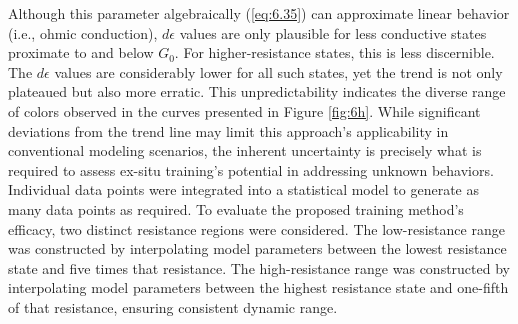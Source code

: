 \noindent Although this parameter algebraically (\ref{eq:6.35}) can approximate linear behavior (i.e., ohmic conduction), $d\epsilon$ values are only plausible for less conductive states proximate to and below $G_0$. For higher-resistance states, this is less discernible. The $d\epsilon$ values are considerably lower for all such states, yet the trend is not only plateaued but also more erratic. This unpredictability indicates the diverse range of colors observed in the curves presented in Figure \ref{fig:6h}. While significant deviations from the trend line may limit this approach's applicability in conventional modeling scenarios, the inherent uncertainty is precisely what is required to assess ex-situ training's potential in addressing unknown behaviors.\\


\noindent Individual data points were integrated into a statistical model to generate as many data points as required. To evaluate the proposed training method's efficacy, two distinct resistance regions were considered. The low-resistance range was constructed by interpolating model parameters between the lowest resistance state and five times that resistance. The high-resistance range was constructed by interpolating model parameters between the highest resistance state and one-fifth of that resistance, ensuring consistent dynamic range.\\


